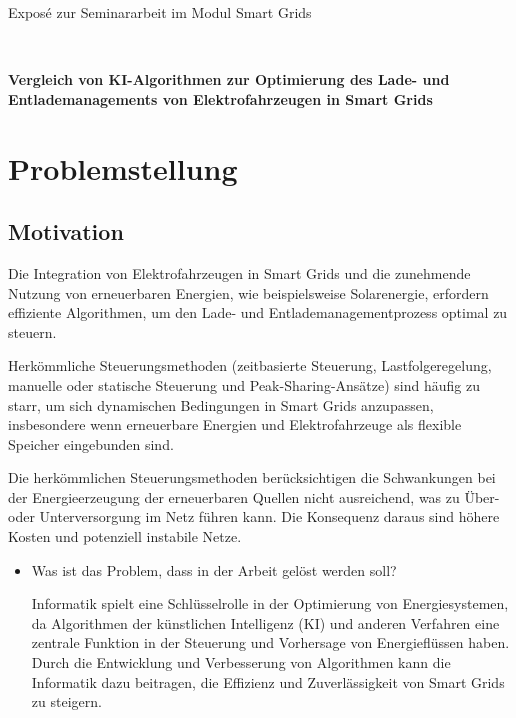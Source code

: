 \documentclass[12pt]{article} %
\begin{document}
\begin{center}
   \baselineskip
   
   Exposé zur Seminararbeit im Modul Smart Grids
   
   ~
   
   {\LARGE\bfseries
     Vergleich von KI-Algorithmen zur Optimierung des Lade- und Entlademanagements
     von Elektrofahrzeugen in Smart Grids}

   \large
   
\end{center}

\section{Problemstellung}

\subsection{Motivation}
Die Integration von Elektrofahrzeugen in Smart Grids und die zunehmende Nutzung von
erneuerbaren Energien, wie beispielsweise Solarenergie, erfordern effiziente Algorithmen,
um den Lade- und Entlademanagementprozess optimal zu steuern.

Herkömmliche Steuerungsmethoden (zeitbasierte Steuerung, Lastfolgeregelung, manuelle
oder statische Steuerung und Peak-Sharing-Ansätze) sind häufig zu starr, um sich
dynamischen Bedingungen in Smart Grids anzupassen, insbesondere wenn erneuerbare
Energien und Elektrofahrzeuge als flexible Speicher eingebunden sind.

Die herkömmlichen Steuerungsmethoden berücksichtigen die Schwankungen bei der Energieerzeugung
der erneuerbaren Quellen nicht ausreichend, was zu Über- oder Unterversorgung im Netz
führen kann. Die Konsequenz daraus sind höhere Kosten und potenziell instabile Netze.



\begin{itemize}
\item Was ist das Problem, dass in der Arbeit gelöst werden soll?

Informatik spielt eine Schlüsselrolle in der Optimierung von Energiesystemen, da Algorithmen der künstlichen Intelligenz (KI) und anderen Verfahren eine zentrale Funktion in der Steuerung und Vorhersage von Energieflüssen haben. Durch die Entwicklung und Verbesserung von Algorithmen kann die Informatik dazu beitragen, die Effizienz und Zuverlässigkeit von Smart Grids zu steigern.
\end{itemize}
\end{document}
